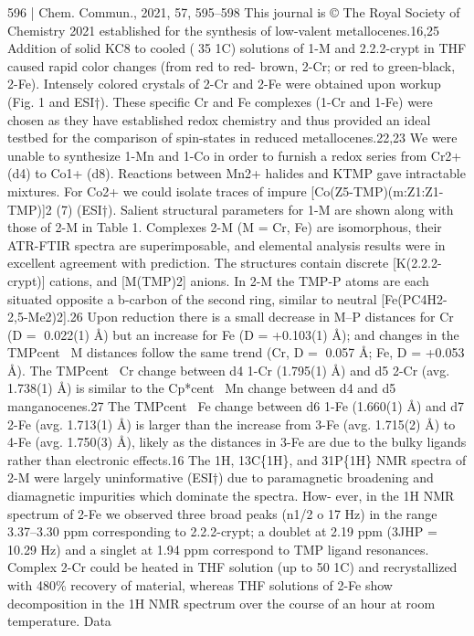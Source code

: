 \documentclass{article}
\begin{document}
596 | Chem. Commun., 2021, 57, 595--598
This journal is © The Royal Society of Chemistry 2021
established for the synthesis of low-valent metallocenes.16,25
Addition of solid KC8 to cooled (35 1C) solutions of 1-M and
2.2.2-crypt in THF caused rapid color changes (from red to red-
brown, 2-Cr; or red to green-black, 2-Fe). Intensely colored crystals
of 2-Cr and 2-Fe were obtained upon workup (Fig. 1 and ESI†).
These specific Cr and Fe complexes (1-Cr and 1-Fe) were
chosen as they have established redox chemistry and thus
provided an ideal testbed for the comparison of spin-states in
reduced metallocenes.22,23 We were unable to synthesize 1-Mn
and 1-Co in order to furnish a redox series from Cr2+ (d4) to
Co1+ (d8). Reactions between Mn2+ halides and KTMP gave
intractable mixtures. For Co2+ we could isolate traces of impure
[Co(Z5-TMP)(m:Z1:Z1-TMP)]2 (7) (ESI†).
Salient structural parameters for 1-M are shown along with
those of 2-M in Table 1. Complexes 2-M (M = Cr, Fe) are
isomorphous, their ATR-FTIR spectra are superimposable,
and elemental analysis results were in excellent agreement with
prediction. The structures contain discrete [K(2.2.2-crypt)]
cations, and [M(TMP)2] anions. In 2-M the TMP-P atoms are
each situated opposite a b-carbon of the second ring, similar to
neutral [Fe(PC4H2-2,5-Me2)2].26 Upon reduction there is a small
decrease in M–P distances for Cr (D = 0.022(1) Å) but an increase
for Fe (D = +0.103(1) Å); and changes in the TMPcentM distances
follow the same trend (Cr, D = 0.057 Å; Fe, D = +0.053 Å). The
TMPcentCr change between d4 1-Cr (1.795(1) Å) and d5 2-Cr
(avg. 1.738(1) Å) is similar to the Cp*centMn change between d4
and d5 manganocenes.27 The TMPcentFe change between d6
1-Fe (1.660(1) Å) and d7 2-Fe (avg. 1.713(1) Å) is larger than the
increase from 3-Fe (avg. 1.715(2) Å) to 4-Fe (avg. 1.750(3) Å), likely
as the distances in 3-Fe are due to the bulky ligands rather than
electronic effects.16
The 1H, 13C\{1H\}, and 31P\{1H\} NMR spectra of 2-M were
largely uninformative (ESI†) due to paramagnetic broadening
and diamagnetic impurities which dominate the spectra. How-
ever, in the 1H NMR spectrum of 2-Fe we observed three broad
peaks (n1/2 o 17 Hz) in the range 3.37–3.30 ppm corresponding
to 2.2.2-crypt; a doublet at 2.19 ppm (3JHP = 10.29 Hz) and a
singlet at 1.94 ppm correspond to TMP ligand resonances.
Complex 2-Cr could be heated in THF solution (up to 50 1C)
and recrystallized with 480\% recovery of material, whereas
THF solutions of 2-Fe show decomposition in the 1H NMR
spectrum over the course of an hour at room temperature. Data
\end{document}
